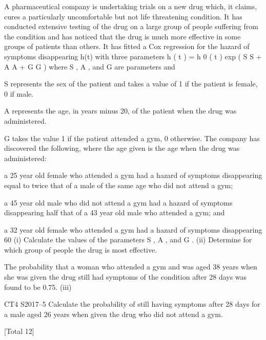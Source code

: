 \documentclass[a4paper,12pt]{article}
\begin{document}

A pharmaceutical company is undertaking trials on a new drug which, it claims, cures
a particularly uncomfortable but not life threatening condition. It has conducted
extensive testing of the drug on a large group of people suffering from the condition
and has noticed that the drug is much more effective in some groups of patients than
others. It has fitted a Cox regression for the hazard of symptoms disappearing h(t)
with three parameters
h ( t ) = h 0 ( t ) exp ( S \beta S + A \beta A + G \beta G )
where \beta S , \beta A , and \beta G are parameters and
\item  S represents the sex of the patient and takes a value of 1 if the patient is female, 0
if male.
\item  A represents the age, in years minus 20, of the patient when the drug was
administered.
\item  G takes the value 1 if the patient attended a gym, 0 otherwise.
The company has discovered the following, where the age given is the age when the
drug was administered:
\item  a 25 year old female who attended a gym had a hazard of symptoms disappearing
equal to twice that of a male of the same age who did not attend a gym;
\item  a 45 year old male who did not attend a gym had a hazard of symptoms
disappearing half that of a 43 year old male who attended a gym; and
\item  a 32 year old female who attended a gym had a hazard of symptoms disappearing
60%
(i) Calculate the values of the parameters \beta S , \beta A , and \beta G .
(ii) Determine for which group of people the drug is most effective.

The probability that a woman who attended a gym and was aged 38 years when
she was given the drug still had symptoms of the condition after 28 days was found to
be 0.75.
(iii)

CT4 S2017–5 
Calculate the probability of still having symptoms after 28 days for a male
aged 26 years when given the drug who did not attend a gym.

[Total 12]
\end{document}
